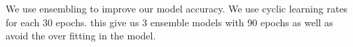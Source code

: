 We use ensembling to improve our model accuracy. We use cyclic learning rates for each 30 epochs. this give us 3 ensemble models with 90 epochs as well as avoid the over fitting in the model.
